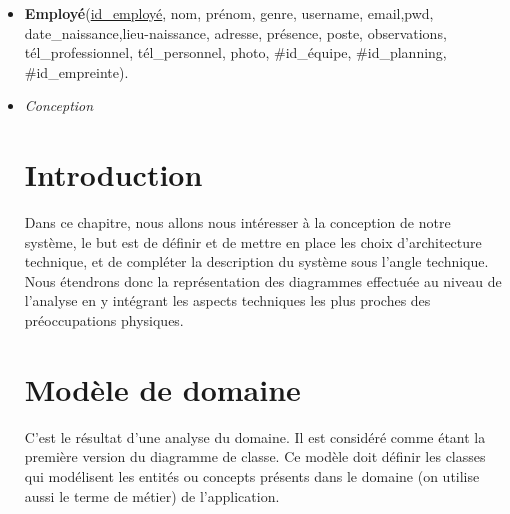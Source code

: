 \begin{itemize}
    \item [\textbullet]\textbf{Employé}(\underline{id\_employé}, nom, prénom, genre, username, email,pwd, date\_naissance,lieu-naissance, adresse, présence, poste, observations, tél\_professionnel, tél\_personnel, photo, \#id\_équipe, \#id\_planning, \#id\_empreinte).
    
    \item [\tConception}
\fancyhead[R]{\textit{Conception}}
\renewcommand{\headrulewidth}{1pt}

\section{Introduction}
Dans ce chapitre, nous allons nous intéresser à la conception de notre système, le but est de définir et de mettre en place les choix d’architecture technique, et de compléter la description du système sous l’angle technique. Nous étendrons donc la représentation des diagrammes effectuée au niveau de l’analyse en y intégrant les aspects techniques les plus proches des préoccupations physiques.

\section{Modèle de domaine}
C’est le résultat d’une analyse du domaine. Il est considéré comme étant la première version du diagramme de classe. Ce modèle doit définir les classes qui modélisent les entités ou concepts présents dans le domaine (on utilise aussi le terme de métier) de l’application.


\end{itemize}
